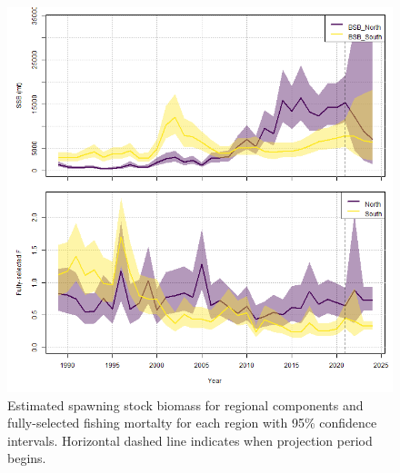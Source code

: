 \documentclass[
]{article}
\begin{document}
\begin{figure}

{\centering \includegraphics[width=1\linewidth]{../2023.RT.Runs/Run34/projections/plots_png/results/SSB_F_trend} 

}

\caption{Estimated spawning stock biomass for regional components and fully-selected fishing mortalty for each region with 95\% confidence intervals. Horizontal dashed line indicates when projection period begins.}\label{fig:SSB-F-proj}
\end{figure}
\clearpage
\end{document}
